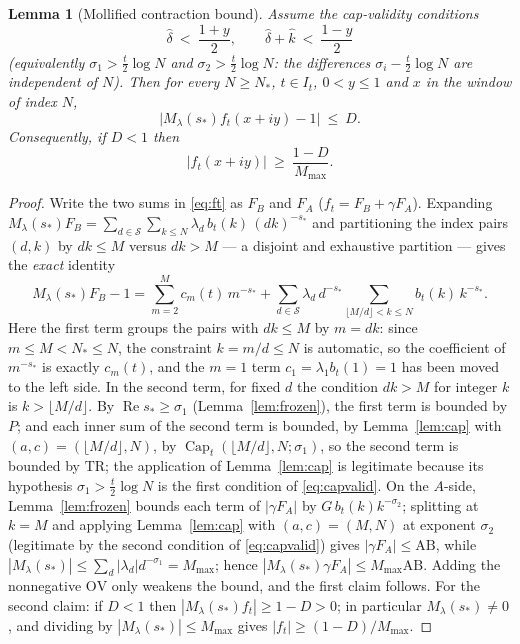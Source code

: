 \documentclass[11pt]{article}
\newtheorem{lemma}[theorem]{Lemma}
\theoremstyle{definition}
\newcommand{\calS}{\mathcal{S}}
\newcommand{\CapT}{\operatorname{Cap}}
\DeclareMathOperator{\Rea}{Re}
\begin{document}
\begin{lemma}[Mollified contraction bound]\label{lem:contraction}
Assume the cap-validity conditions
\begin{equation}\label{eq:capvalid}
\widehat\delta\ <\ \frac{1+y}2,
\qquad
\widehat\delta+\widehat k\ <\ \frac{1-y}2
\end{equation}
(equivalently $\sigma_1>\frac t2\log N$ and
$\sigma_2>\frac t2\log N$: the differences
$\sigma_i-\frac t2\log N$ are independent of $N$). Then for every
$N\ge N_*$, $t\in I_t$, $0<y\le1$ and $x$ in the window of index
$N$,
\[
\bigl|M_\lambda(s_*)f_t(x+iy)-1\bigr|\ \le\ D .
\]
Consequently, if $D<1$ then
\begin{equation}\label{eq:flowlower}
|f_t(x+iy)|\ \ge\ \frac{1-D}{M_{\max}} .
\end{equation}
\end{lemma}

\begin{proof}
Write the two sums in \eqref{eq:ft} as $F_B$ and $F_A$
($f_t=F_B+\gamma F_A$). Expanding
$M_\lambda(s_*)F_B=\sum_{d\in\calS}\sum_{k\le N}
\lambda_d\,b_t(k)\,(dk)^{-s_*}$ and partitioning the index pairs
$(d,k)$ by $dk\le M$ versus $dk>M$ --- a disjoint and exhaustive
partition --- gives the \emph{exact} identity
\begin{equation}\label{eq:tailconv}
M_\lambda(s_*)F_B-1
=\sum_{m=2}^{M}c_m(t)\,m^{-s_*}
+\sum_{d\in\calS}\lambda_d\,d^{-s_*}
\sum_{\lfloor M/d\rfloor<k\le N}b_t(k)\,k^{-s_*} .
\end{equation}
Here the first term groups the pairs with $dk\le M$ by $m=dk$: since
$m\le M<N_*\le N$, the constraint $k=m/d\le N$ is automatic, so the
coefficient of $m^{-s_*}$ is exactly $c_m(t)$, and the $m=1$ term
$c_1=\lambda_1b_t(1)=1$ has been moved to the left side. In the
second term, for fixed $d$ the condition $dk>M$ for integer $k$ is
$k>\lfloor M/d\rfloor$. By $\Rea s_*\ge\sigma_1$
(Lemma~\ref{lem:frozen}), the first term is bounded by $P$; and
each inner sum of the second term is bounded, by
Lemma~\ref{lem:cap} with $(a,c)=(\lfloor M/d\rfloor,N)$, by
$\CapT_t(\lfloor M/d\rfloor,N;\sigma_1)$, so the second term is
bounded by $\mathrm{TR}$; the application of Lemma~\ref{lem:cap} is
legitimate because its hypothesis $\sigma_1>\frac t2\log N$ is the
first condition of \eqref{eq:capvalid}. On the $A$-side,
Lemma~\ref{lem:frozen} bounds each term of $|\gamma F_A|$ by
$G\,b_t(k)k^{-\sigma_2}$; splitting at $k=M$ and applying
Lemma~\ref{lem:cap} with $(a,c)=(M,N)$ at exponent $\sigma_2$
(legitimate by the second condition of \eqref{eq:capvalid}) gives
$|\gamma F_A|\le\mathrm{AB}$, while
$|M_\lambda(s_*)|\le\sum_d|\lambda_d|d^{-\sigma_1}=M_{\max}$;
hence $|M_\lambda(s_*)\gamma F_A|\le M_{\max}\mathrm{AB}$. Adding
the nonnegative $\mathrm{OV}$ only weakens the bound, and the first
claim follows. For the second claim: if $D<1$ then
$|M_\lambda(s_*)f_t|\ge1-D>0$; in particular
$M_\lambda(s_*)\neq0$, and dividing by
$|M_\lambda(s_*)|\le M_{\max}$ gives
$|f_t|\ge(1-D)/M_{\max}$.
\end{proof}
\end{document}
